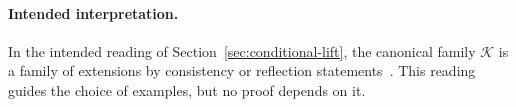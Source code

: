 \paragraph{Intended interpretation.}
In the intended reading of Section~\ref{sec:conditional-lift}, the canonical family $\mathcal{K}$ is a family of extensions by consistency or reflection statements~\cite{Turing1939,Feferman1962,BeklemishevReflection,PakhomovWalsh2021,MontalbanWalsh2019}. This reading guides the choice of examples, but no proof depends on it.
